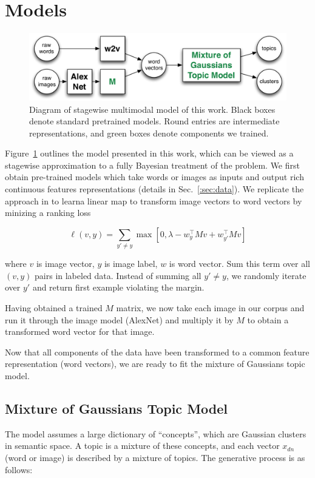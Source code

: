\documentclass[11pt]{article}
\begin{document}
\section{Models}
\begin{figure}
\centering
\includegraphics[width=\columnwidth]{assets/stagewise_model.pdf}
\caption{\label{fig:stagewise} Diagram of stagewise multimodal model of this work. Black boxes denote standard pretrained models. Round entries are intermediate representations, and green boxes denote components we trained.}
\end{figure}

Figure~\ref{fig:stagewise} outlines the model presented in this work, which can be viewed as a stagewise approximation to a fully Bayesian treatment of the problem. We first obtain pre-trained models which take words or images as inputs and output rich continuous features representations (details in Sec.~\ref{:sec:data}). We replicate the approach in \cite{Frome13} to learna linear map to transform image vectors to word vectors by minizing a ranking loss

$$\ell(v, y) = \sum_{y' \neq y} \max \left[0, \lambda - w_{y}^\top M v + w_{y'} ^\top M v \right]$$

where $v$ is image vector, $y$ is image label, $w$ is word vector. Sum this term over all $(v, y)$ pairs in labeled data. Instead of summing all $y' \neq y$, we randomly iterate over $y'$ and return first example violating the margin.

Having obtained a trained $M$ matrix, we now take each image in our corpus and run it through the image model (AlexNet) and multiply it by $M$ to obtain a transformed word vector for that image.

Now that all components of the data have been transformed to a common feature representation (word vectors), we are ready to fit the mixture of Gaussians topic model.

\subsection{Mixture of Gaussians Topic Model}
The model assumes a large dictionary of ``concepts'', which are Gaussian clusters in semantic space. A topic is a mixture of these concepts, and each vector $x_{dn}$ (word or image) is described by a mixture of topics. The generative process is as follows:
\end{document}

